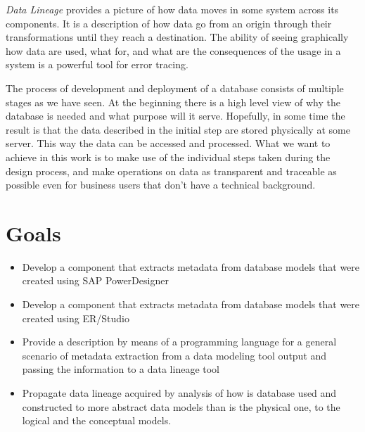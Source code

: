 \par
\textit{Data Lineage} provides a picture of how data moves in some system across its components. It is a description of how data go from an origin through their transformations until they reach a destination. 
The ability of seeing graphically how data are used, what for, and what are the consequences of the usage in a system is a powerful tool for error tracing. \\

\par
The process of development and deployment of a database consists of multiple stages as we have seen. At the beginning there is a high level view of why the database is needed and what purpose will it serve. Hopefully, in some time the result is that the data described in the initial step are stored physically at some server. 
This way the data can be accessed and processed. 
What we want to achieve in this work is to make use of the individual steps taken during the design process, and make operations on data as transparent and traceable as possible even for business users that don't have a technical background.

\section{Goals}

\begin{itemize}
	\item Develop a component that extracts metadata from database models that were created using SAP PowerDesigner 
	\item Develop a component that extracts metadata from database models that were created using ER/Studio
	\item Provide a description by means of a programming language for a general scenario of metadata extraction from a data modeling tool output and passing the information to a data lineage tool
	\item Propagate data lineage acquired by analysis of how is database used and constructed to more abstract data models than is the physical one, to the logical and the conceptual models.
\end{itemize}


